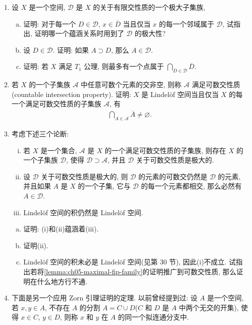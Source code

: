 \documentclass[../../main.tex]{subfiles}
\begin{document}
\begin{enumerate}
\item 设 $X$ 是一个空间, $\mathcal{D}$ 是 $X$ 的关于有限交性质的一个极大子集族,
\begin{enumerate}[(a)]
\item 证明: 对于每一个 $D\in\mathcal{D}$, $x\in\overline{D}$ 当且仅当 $x$ 的每一个邻域属于 $\mathcal{D}$, 试指出, 证明哪一个蕴涵关系时用到了 $\mathcal{D}$ 的极大性?
\item 设 $D\in\mathcal{D}$. 证明: 如果 $A\supset D$, 那么 $A\in\mathcal{D}$.
\item 证明: 若 $X$ 满足 $T_1$ 公理, 则最多有一个点属于 $\bigcap_{D\in\mathcal{D}}\overline{D}$.
\end{enumerate}
\item 若 $X$ 的一个子集族 $\mathcal{A}$ 中任意可数个元素的交非空, 则称 $\mathcal{A}$ 满足可数交性质(countable intersection property). 证明: $X$ 是 Lindelöf 空间当且仅当 $X$ 的每一个满足可数交性质的子集族 $\mathcal{A}$, 有
\begin{align*}
\bigcap_{A\in\mathcal{A}}\overline{A}\neq\varnothing.
\end{align*}
\item 考虑下述三个论断:
\begin{enumerate}[(i)]
\item 若 $X$ 是一个集合, $\mathcal{A}$ 是 $X$ 的一个满足可数交性质的子集族, 则存在 $X$ 的一个子集族 $\mathcal{D}$, 使得 $\mathcal{D}\supset\mathcal{A}$, 并且 $\mathcal{D}$ 关于可数交性质是极大的.
\item 设 $\mathcal{D}$ 关于可数交性质是极大的, 则 $\mathcal{D}$ 的元素的可数交仍然是 $\mathcal{D}$ 的元素, 并且如果 $A$ 是 $X$ 的一个子集, 它与 $\mathcal{D}$ 的每一个元素都相交, 那么必然有 $A\in\mathcal{D}$.
\item Lindelöf 空间的积仍然是 Lindelöf 空间.
\end{enumerate}
\begin{enumerate}[(a)]
\item 证明: (i)和(ii)蕴涵着(iii).
\item 证明(ii).
\item Lindelöf 空间的积未必是 Lindelöf 空间(见第 30 节), 因此(i)不成立. 试指出若将\cref{lemma:ch05-maximal-fip-family}的证明推广到可数交性质, 那么证明在什么地方行不通.
\end{enumerate}
\item 下面是另一个应用 Zorn 引理证明的定理. 以前曾经提到过: 设 $A$ 是一个空间, 若 $x,y\in A$, 不存在 $A$ 的分割 $A=C\cup D$($C$ 和 $D$ 是 $A$ 中两个无交的开集), 使得 $x\in C$, $y\in D$, 则称 $x$ 和 $y$ 在 $A$ 的同一个拟连通分支中.


\end{enumerate}
\end{document}
